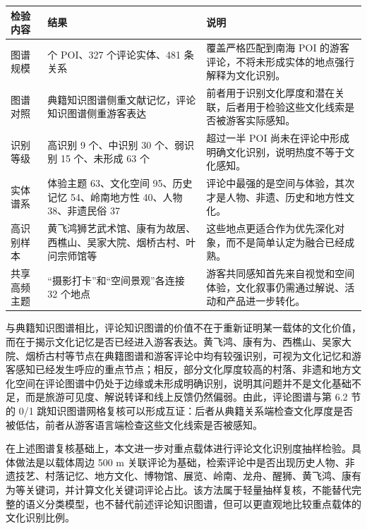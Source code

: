 \begin{table}[H]
\centering
{}
{\scriptsize
\setlength{\tabcolsep}{3.0pt}
\renewcommand{\arraystretch}{1.15}
\begin{tabularx}{\textwidth}{@{}>{\centering\arraybackslash}p{}
>{\centering\arraybackslash}p{}
>{\raggedright\arraybackslash}X@{}}
\toprule
\textbf{检验内容} & \textbf{结果} & \textbf{说明} \\
\midrule
图谱规模 & 117 个 POI、327 个评论实体、481 条关系 & 覆盖严格匹配到南海 POI 的游客评论，不将未形成实体的地点强行解释为文化识别。 \\
图谱对照 & 典籍知识图谱侧重文献记忆，评论知识图谱侧重游客表达 & 前者用于识别文化厚度和潜在关联，后者用于检验这些文化线索是否被游客实际感知。 \\
识别等级 & 高识别 9 个、中识别 30 个、弱识别 15 个、未形成 63 个 & 超过一半 POI 尚未在评论中形成明确文化识别，说明热度不等于文化感知。 \\
实体谱系 & 体验主题 63、文化空间 95、历史记忆 54、岭南地方性 40、人物 38、非遗民俗 37 & 评论中最强的是空间与体验，其次才是人物、非遗、历史和地方性文化。 \\
高识别样本 & 黄飞鸿狮艺武术馆、康有为故居、西樵山、吴家大院、烟桥古村、叶问宗师馆等 & 这些地点更适合作为优先深化对象，而不是简单认定为融合已经成熟。 \\
共享高频主题 & ``摄影打卡''和``空间景观''各连接 32 个地点 & 游客共同感知首先来自视觉和空间体验，文化叙事仍需通过解说、活动和产品进一步转化。 \\
\bottomrule
\end{tabularx}
}
\end{table}

与典籍知识图谱相比，评论知识图谱的价值不在于重新证明某一载体的文化价值，而在于揭示文化记忆是否已经进入游客表达。黄飞鸿、康有为、西樵山、吴家大院、烟桥古村等节点在典籍图谱和游客评论中均有较强识别，可视为文化记忆和游客感知已经发生呼应的重点节点；相反，部分文化厚度较高的村落、非遗和地方文化空间在评论图谱中仍处于边缘或未形成明确识别，说明其问题并不是文化基础不足，而是旅游可见度、解说转译和线上反馈仍然偏弱。由此，评论图谱与第 6.2 节的 0/1 跳知识图谱网格复核可以形成互证：后者从典籍关系端检查文化厚度是否被低估，前者从游客语言端检查这些文化线索是否被感知。

在上述图谱复核基础上，本文进一步对重点载体进行评论文化识别度抽样检验。具体做法是以载体周边 500 m 关联评论为基础，检索评论中是否出现历史人物、非遗技艺、村落记忆、地方文化、博物馆、展览、岭南、龙舟、醒狮、黄飞鸿、康有为等关键词，并计算文化关键词评论占比。该方法属于轻量抽样复核，不能替代完整的语义分类模型，也不替代前述评论知识图谱，但可以更直观地比较重点载体的文化识别比例。


